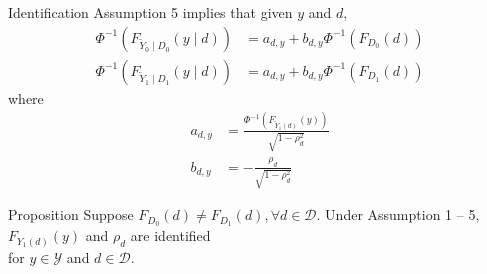 \documentclass[aspectratio=1610, 9pt]{beamer}
\begin{document}
\begin{frame}{Identification}
Assumption 5 implies that given $y$ and $d$,
\begin{align*}
    \Phi^{-1}\left(F_{\tilde{Y}_{0}\mid D_{0}}(y\mid d)\right)	&=a_{d,y}+b_{d,y}\Phi^{-1}\left(F_{D_{0}}(d)\right)\\
\Phi^{-1}\left(F_{\tilde{Y}_{1}\mid D_{1}}(y\mid d)\right)	&=a_{d,y}+b_{d,y}\Phi^{-1}\left(F_{D_{1}}(d)\right)
\end{align*}
where 
\begin{align*}
    a_{d,y}	&=\frac{\Phi^{-1}\left(F_{\tilde{Y}_1(d)}(y)\right)}{\sqrt{1-\rho_{d}^{2}}}\\
b_{d,y}	&=-\frac{\rho_{d}}{\sqrt{1-\rho_{d}^{2}}}
\end{align*}

\begin{block}{Proposition}
    Suppose $F_{D_0}(d)\neq F_{D_1}(d), \forall d\in \mathcal{D}$. Under Assumption 1 -- 5, \ $F_{Y_{1}(d)}(y)$ and $\rho_{d}$ are identified \\ for $y\in\mathcal{Y}$ and $d\in\mathcal{D}$.
\end{block} 
    
\end{frame}
\end{document}
